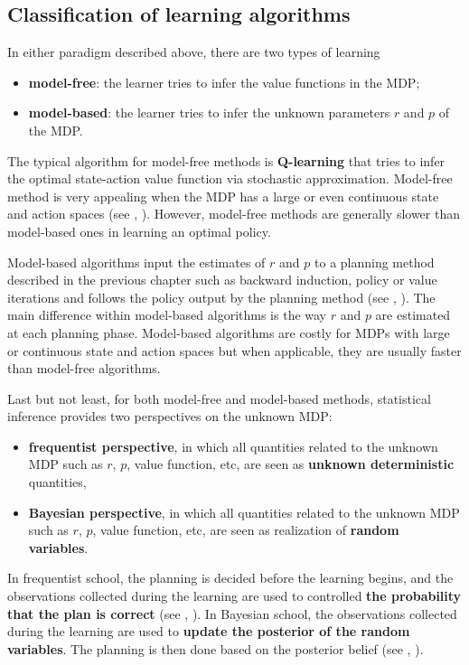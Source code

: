 \subsection{Classification of learning algorithms}
\label{ch:rl:ssec:class_algo}

In either paradigm described above, there are two types of learning
\begin{itemize}
    \item \textbf{model-free}: the learner tries to infer the value functions in the MDP;
    \item \textbf{model-based}: the learner tries to infer the unknown parameters $r$ and $p$ of the MDP.
\end{itemize}
The typical algorithm for model-free methods is \textbf{Q-learning} \cite{watkins1989learning} that tries to infer the optimal state-action value function via stochastic approximation. 
Model-free method is very appealing when the MDP has a large or even continuous state and action spaces (see \eg, \cite{mnih2015human, bellemare2017distributional, dabney2018distributional}).
However, model-free methods are generally slower than model-based ones in learning an optimal policy.

Model-based algorithms input the estimates of $r$ and $p$ to a planning method described in the previous chapter such as backward induction, policy or value iterations and follows the policy output by the planning method (see \eg, \cite{jaksch2010near, osband2013more, azar2017minimax}).
The main difference within model-based algorithms is the way $r$ and $p$ are estimated at each planning phase.
Model-based algorithms are costly for MDPs with large or continuous state and action spaces but when applicable, they are usually faster than model-free algorithms.

Last but not least, for both model-free and model-based methods, statistical inference provides two perspectives on the unknown MDP:
\begin{itemize}
    \item \textbf{frequentist perspective}, in which all quantities related to the unknown MDP such as $r$, $p$, value function, etc, are seen as \textbf{unknown deterministic} quantities,
    \item \textbf{Bayesian perspective}, in which all quantities related to the unknown MDP such as $r$, $p$, value function, etc, are seen as realization of \textbf{random variables}.
\end{itemize}
In frequentist school, the planning is decided before the learning begins, and the observations collected during the learning are used to controlled \textbf{the probability that the plan is correct} (see \eg, \cite{jaksch2010near, azar2017minimax, jin2018q, shi2022pessimistic}).
In Bayesian school, the observations collected during the learning are used to \textbf{update the posterior of the random variables}.
The planning is then done based on the posterior belief (see \eg, \cite{osband2013more, ouyang2017learning, bellemare2017distributional, dabney2018distributional}).

